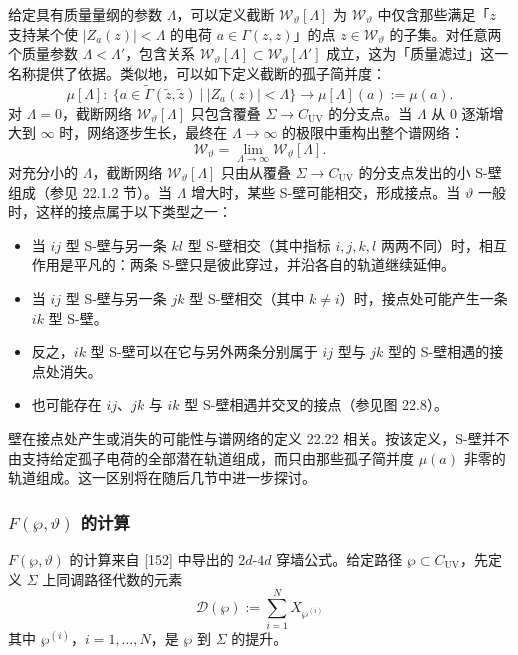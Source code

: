 给定具有质量量纲的参数 $\Lambda$，可以定义截断 $\mathcal{W}_\vartheta[\Lambda]$ 为 $\mathcal{W}_\vartheta$ 中仅含那些满足「$z$ 支持某个使 $|Z_a(z)|<\Lambda$ 的电荷 $a\in\Gamma(z,z)$」的点 $z\in\mathcal{W}_\vartheta$ 的子集。对任意两个质量参数 $\Lambda<\Lambda'$，包含关系 $\mathcal{W}_\vartheta[\Lambda]\subset\mathcal{W}_\vartheta[\Lambda']$ 成立，这为「质量滤过」这一名称提供了依据。类似地，可以如下定义截断的孤子简并度：
\[
\mu[\Lambda]:\ \big\{a\in\widetilde{\Gamma}(\widetilde{z},\widetilde{z})\ \big|\ |Z_a(z)|<\Lambda\big\}\longrightarrow \mu[\Lambda](a):=\mu(a).
\]
对 $\Lambda=0$，截断网络 $\mathcal{W}_\vartheta[\Lambda]$ 只包含覆叠 $\Sigma\to C_{\mathrm{UV}}$ 的分支点。当 $\Lambda$ 从 $0$ 逐渐增大到 $\infty$ 时，网络逐步生长，最终在 $\Lambda\to\infty$ 的极限中重构出整个谱网络：
\[
\mathcal{W}_\vartheta=\lim_{\Lambda\to\infty}\mathcal{W}_\vartheta[\Lambda].
\]
对充分小的 $\Lambda$，截断网络 $\mathcal{W}_\vartheta[\Lambda]$ 只由从覆叠 $\Sigma\to C_{\mathrm{UV}}$ 的分支点发出的小 S-壁组成（参见 22.1.2 节）。当 $\Lambda$ 增大时，某些 S-壁可能相交，形成接点。当 $\vartheta$ 一般时，这样的接点属于以下类型之一：
\begin{itemize}
\item 当 $ij$ 型 S-壁与另一条 $kl$ 型 S-壁相交（其中指标 $i,j,k,l$ 两两不同）时，相互作用是平凡的：两条 S-壁只是彼此穿过，并沿各自的轨道继续延伸。
\item 当 $ij$ 型 S-壁与另一条 $jk$ 型 S-壁相交（其中 $k\ne i$）时，接点处可能产生一条 $ik$ 型 S-壁。
\item 反之，$ik$ 型 S-壁可以在它与另外两条分别属于 $ij$ 型与 $jk$ 型的 S-壁相遇的接点处消失。
\item 也可能存在 $ij$、$jk$ 与 $ik$ 型 S-壁相遇并交叉的接点（参见图 22.8）。
\end{itemize}

\begin{remark}[22.24]
壁在接点处产生或消失的可能性与谱网络的定义 22.22 相关。按该定义，S-壁并不由支持给定孤子电荷的全部潜在轨道组成，而只由那些孤子简并度 $\mu(a)$ 非零的轨道组成。这一区别将在随后几节中进一步探讨。
\end{remark}

\subsubsection*{$F(\wp,\vartheta)$ 的计算}

$F(\wp,\vartheta)$ 的计算来自 [152] 中导出的 $2d$-$4d$ 穿墙公式。给定路径 $\wp\subset C_{\mathrm{UV}}$，先定义 $\Sigma$ 上同调路径代数的元素
\begin{equation}
\mathcal{D}(\wp):=\sum_{i=1}^{N}X_{\wp^{(i)}}\tag{22.14}
\end{equation}
其中 $\wp^{(i)}$，$i=1,\dots,N$，是 $\wp$ 到 $\Sigma$ 的提升。

